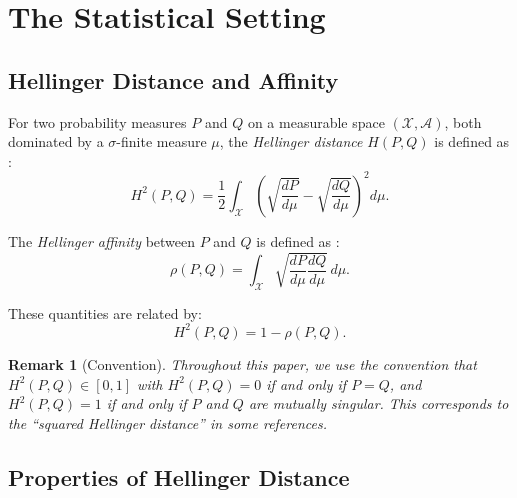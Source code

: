 \documentclass[preprint,review,12pt]{article}
\newtheorem{remark}[theorem]{Remark}
\begin{document}
\section{The Statistical Setting}
\label{sec:setting}

\subsection{Hellinger Distance and Affinity}

For two probability measures $P$ and $Q$ on a measurable space $(\mathcal{X}, \mathcal{A})$, 
both dominated by a $\sigma$-finite measure $\mu$, the \emph{Hellinger distance} 
$H(P, Q)$ is defined as \citep{LeCam1986}:
\begin{equation}\label{eq:hellinger_def}
H^2(P, Q) = \frac{1}{2} \int_{\mathcal{X}} \left( \sqrt{\frac{dP}{d\mu}} 
- \sqrt{\frac{dQ}{d\mu}} \right)^2 d\mu.
\end{equation}

The \emph{Hellinger affinity} between $P$ and $Q$ is defined as \citep{Kakutani1948}:
\begin{equation}\label{eq:affinity_def}
\rho(P, Q) = \int_{\mathcal{X}} \sqrt{\frac{dP}{d\mu} \frac{dQ}{d\mu}} \, d\mu.
\end{equation}

These quantities are related by:
\begin{equation}\label{eq:affinity_distance}
H^2(P, Q) = 1 - \rho(P, Q).
\end{equation}

\begin{remark}[Convention]
Throughout this paper, we use the convention that $H^2(P,Q) \in [0,1]$ with 
$H^2(P,Q) = 0$ if and only if $P = Q$, and $H^2(P,Q) = 1$ if and only if 
$P$ and $Q$ are mutually singular. This corresponds to the ``squared Hellinger 
distance'' in some references.
\end{remark}

\subsection{Properties of Hellinger Distance}
\end{document}
